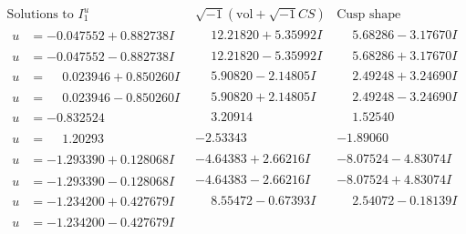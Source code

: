 \documentclass[1p]{elsarticle_modified}
\theoremstyle{definition}
\newcommand{\I}{\sqrt{-1}}
\begin{document}
$$\begin{array}{c|c|c}  
\text{Solutions to }I^u_{1}& \I (\text{vol} + \sqrt{-1}CS) & \text{Cusp shape}\\
 \hline 
\begin{aligned}
u &= -0.047552 + 0.882738 I\end{aligned}
 & \phantom{-}12.21820 + 5.35992 I & \phantom{-}5.68286 - 3.17670 I \\ \hline\begin{aligned}
u &= -0.047552 - 0.882738 I\end{aligned}
 & \phantom{-}12.21820 - 5.35992 I & \phantom{-}5.68286 + 3.17670 I \\ \hline\begin{aligned}
u &= \phantom{-}0.023946 + 0.850260 I\end{aligned}
 & \phantom{-}5.90820 - 2.14805 I & \phantom{-}2.49248 + 3.24690 I \\ \hline\begin{aligned}
u &= \phantom{-}0.023946 - 0.850260 I\end{aligned}
 & \phantom{-}5.90820 + 2.14805 I & \phantom{-}2.49248 - 3.24690 I \\ \hline\begin{aligned}
u &= -0.832524\phantom{ +0.000000I}\end{aligned}
 & \phantom{-}3.20914\phantom{ +0.000000I} & \phantom{-}1.52540\phantom{ +0.000000I} \\ \hline\begin{aligned}
u &= \phantom{-}1.20293\phantom{ +0.000000I}\end{aligned}
 & -2.53343\phantom{ +0.000000I} & -1.89060\phantom{ +0.000000I} \\ \hline\begin{aligned}
u &= -1.293390 + 0.128068 I\end{aligned}
 & -4.64383 + 2.66216 I & -8.07524 - 4.83074 I \\ \hline\begin{aligned}
u &= -1.293390 - 0.128068 I\end{aligned}
 & -4.64383 - 2.66216 I & -8.07524 + 4.83074 I \\ \hline\begin{aligned}
u &= -1.234200 + 0.427679 I\end{aligned}
 & \phantom{-}8.55472 - 0.67393 I & \phantom{-}2.54072 - 0.18139 I \\ \hline\begin{aligned}
u &= -1.234200 - 0.427679 I\end{aligned}

\end{array}$$
\end{document}
